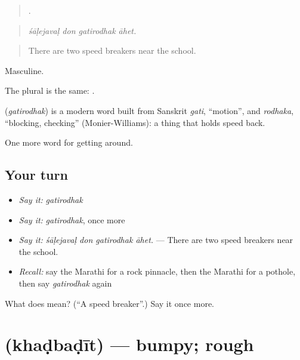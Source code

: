 \begin{quote}
   .
\end{quote}

\begin{quote}
\emph{śāḷejavaḷ don gatirodhak āhet.}
\end{quote}

\begin{quote}
There are two speed breakers near the school.
\end{quote}

Masculine.

The plural is the same:  .

\begin{cousinweb}
\textbf{} (\emph{gatirodhak}) is a modern word built from Sanskrit \emph{gati}, \textquotedblleft{}motion\textquotedblright{}, and \emph{rodhaka}, \textquotedblleft{}blocking, checking\textquotedblright{} (Monier-Williams): a thing that holds speed back.
\end{cousinweb}

\begin{grammarlens}[title={What you've built}]
One more word for getting around.
\end{grammarlens}

\subsection*{Your turn}
\begin{itemize}
\raggedright
  \item \emph{Say it:} \emph{gatirodhak}
  \item \emph{Say it:} \emph{gatirodhak}, once more
  \item \emph{Say it:} \emph{śāḷejavaḷ don gatirodhak āhet.} — There are two speed breakers near the school.
  \item \emph{Recall:} say the Marathi for a rock pinnacle, then the Marathi for a pothole, then say \emph{gatirodhak} again
\end{itemize}

\begin{tcolorbox}[breakable,colback=teal!4,colframe=teal!35!black,title={Before you move on}]
What does  mean? (\textquotedblleft{}A speed breaker\textquotedblright{}.) Say it once more.
\end{tcolorbox}
\section[\texorpdfstring{\mr{खडबडीत} (khaḍbaḍīt)}{खडबडीत (khaḍbaḍīt)}]{ (khaḍbaḍīt) — bumpy; rough}

